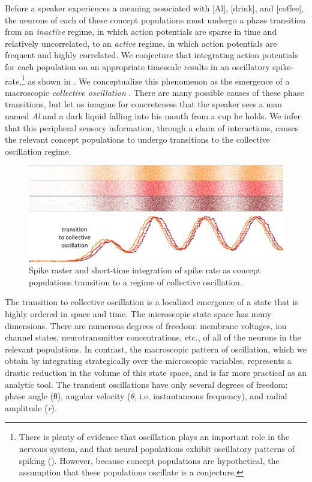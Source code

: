 Before a speaker experiences a meaning associated with [Al], [drink], and [coffee], the neurons of each of these concept populations must undergo a phase transition from an \textit{inactive} regime, in which action potentials are sparse in time and relatively uncorrelated, to an \textit{active} regime, in which action potentials are frequent and highly correlated. We conjecture that integrating action potentials for each population on an appropriate timescale results in an oscillatory spike-rate,\footnote{There is plenty of evidence that oscillation plays an important role in the nervous system, and that neural populations exhibit oscillatory patterns of spiking (\citealt{AverbeckEtAl2003,Buzsaki2006,BuzsákiDraguhn2004,CanoltyKnight2010,EngelEtAl2001,Fuster2001,GerstnerKistler2002,Izhikevich2006,Izhikevich2007,IzhikevichEdelman2008,Klimesch1999}). However, because concept populations are hypothetical, the assumption that these populations oscillate is a conjecture.} as shown in {}. We conceptualize this phenomenon as the emergence of a macroscopic \textit{collective oscillation} \citep{AcebrónEtAl2005,BreakspearEtAl2010,HongStrogatz2011,Kelso1997,SchonerKelso1988,Strogatz2000,Winfree2001}. There are many possible causes of these phase transitions, but let us imagine for concreteness that the speaker sees a man named \textit{Al} and a dark liquid falling into his mouth from a cup he holds. We infer that this peripheral sensory information, through a chain of interactions, causes the relevant concept populations to undergo transitions to the collective oscillation regime.


  
\begin{figure}
\includegraphics[width=\textwidth]{figures/Tilsen-img10.png}
\caption{Spike raster and short-time integration of spike rate as concept populations transition to a regime of collective oscillation.}
\label{fig:2:3}
\end{figure}
 

  The transition to collective oscillation is a localized emergence of a state that is highly ordered in space and time. The microscopic state space has many dimensions. There are numerous degrees of freedom: membrane voltages, ion channel states, neurotransmitter concentrations, etc., of all of the neurons in the relevant populations. In contrast, the macroscopic pattern of oscillation, which we obtain by integrating strategically over the microscopic variables, represents a drastic reduction in the volume of this state space, and is far more practical as an analytic tool. The transient oscillations have only several degrees of freedom: phase angle (θ), angular velocity ($\dot{\theta}$, i.e. instantaneous frequency), and radial amplitude (\textit{r}).

